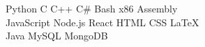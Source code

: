 
Python \textbullet{}  C \textbullet{} C++ \textbullet{} C\# \textbullet{} Bash \textbullet{} x86 Assembly \\
JavaScript \textbullet{} Node.js \textbullet{} React \textbullet{} HTML \textbullet{} CSS \textbullet{} \LaTeX\ \\
Java \textbullet{} MySQL \textbullet{} MongoDB \\